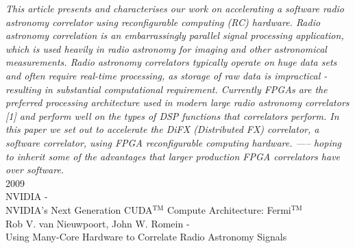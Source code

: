 \textit{This article presents and characterises our work on
accelerating a software radio astronomy correlator
using reconfigurable computing (RC) hardware. Radio
astronomy correlation is an embarrassingly parallel signal
processing application, which is used heavily in
radio astronomy for imaging and other astronomical
measurements. Radio astronomy correlators typically
operate on huge data sets and often require real-time
processing, as storage of raw data is impractical - resulting
in substantial computational requirement. Currently
FPGAs are the preferred processing architecture used in
modern large radio astronomy correlators [1] and perform
well on the types of DSP functions that correlators
perform.
In this paper we set out to accelerate the DiFX
(Distributed FX) correlator, a software correlator, using
FPGA reconfigurable computing hardware. —– hoping
to inherit some of the advantages that larger production
FPGA correlators have over software.}\\

\noindent
{\large 2009}\\
\noindent
{\large NVIDIA - \hfill \\
NVIDIA’s Next Generation
CUDA$^{\textrm{TM}}$ Compute Architecture: Fermi$^{\textrm{TM}}$}\\

\noindent
{\large Rob V. van Nieuwpoort,
John W. Romein  - \hfill \\ Using Many-Core Hardware to Correlate
Radio Astronomy Signals }


